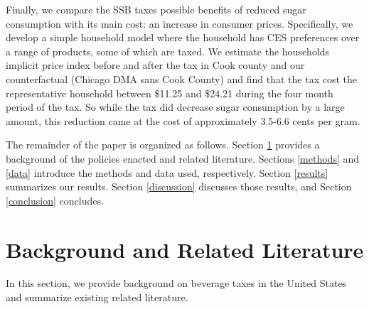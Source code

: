 \documentclass[12pt]{article}
\begin{document}
Finally, we compare the SSB taxes possible benefits of reduced sugar consumption with its main cost: an increase in consumer prices. Specifically, we develop a simple household model where the household has CES preferences over a range of products, some of which are taxed. We estimate the households implicit price index before and after the tax in Cook county and our counterfactual (Chicago DMA sans Cook County) and find that the tax cost the representative household between \$11.25 and \$24.21 during the four month period of the tax. So while the tax did decrease sugar consumption by a large amount, this reduction came at the cost of approximately 3.5-6.6 cents per gram.



The remainder of the paper is organized as follows. Section \ref{background} provides a background of the policies enacted and related literature. Sections \ref{methods} and \ref{data} introduce the methods and data used, respectively. Section \ref{results} summarizes our results. Section \ref{discussion} discusses those results, and Section \ref{conclusion} concludes.

\section{Background and Related Literature} \label{background}


In this section, we provide background on beverage taxes in the United States and summarize existing related literature.
\end{document}
